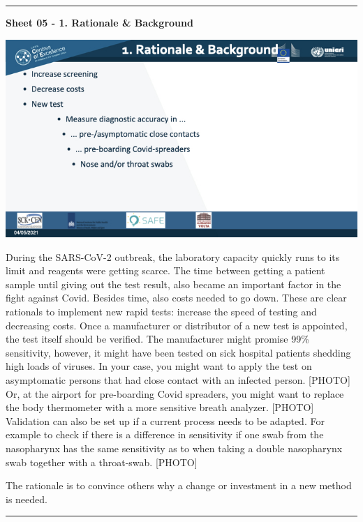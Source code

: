 \documentclass[
]{book}
\begin{document}
\begin{center}\rule{0.5\linewidth}{0.5pt}\end{center}

\textbf{Sheet 05 - 1. Rationale \& Background}

\includegraphics{images/m03/m03_validation_of_test_kits_v2_2.005.jpeg}

During the SARS-CoV-2 outbreak, the laboratory capacity quickly runs to
its limit and reagents were getting scarce. The time between getting a
patient sample until giving out the test result, also became an
important factor in the fight against Covid. Besides time, also costs
needed to go down. These are clear rationals to implement new rapid
tests: increase the speed of testing and decreasing costs. Once a
manufacturer or distributor of a new test is appointed, the test itself
should be verified. The manufacturer might promise 99\% sensitivity,
however, it might have been tested on sick hospital patients shedding
high loads of viruses. In your case, you might want to apply the test on
asymptomatic persons that had close contact with an infected person.
{[}PHOTO{]} Or, at the airport for pre-boarding Covid spreaders, you might
want to replace the body thermometer with a more sensitive breath
analyzer. {[}PHOTO{]} Validation can also be set up if a current process
needs to be adapted. For example to check if there is a difference in
sensitivity if one swab from the nasopharynx has the same sensitivity as
to when taking a double nasopharynx swab together with a throat-swab.
{[}PHOTO{]}

The rationale is to convince others why a change or investment in a new
method is needed.

\begin{center}\rule{0.5\linewidth}{0.5pt}\end{center}
\end{document}
